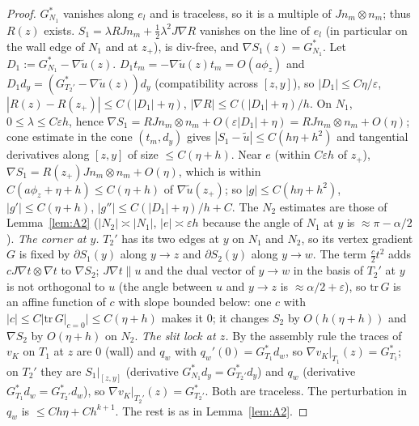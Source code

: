 \documentclass[11pt]{article}
\theoremstyle{remark}
\begin{document}
\begin{proof}
$G^*_{N_1}$ vanishes along $e_l$ and is traceless, so it is a multiple of $Jn_m\otimes n_m$; thus $R(z)$ exists. $S_1=\lambda RJn_m+\frac12\lambda^2J\nabla R$
vanishes on the line of $e_l$ (in particular on the wall edge of $N_1$ and at $z_+$), is div-free, and $\nabla S_1(z)=G^*_{N_1}$.
Let $D_1:=G^*_{N_1}-\nabla\tilde u(z)$. $D_1t_m=-\nabla\tilde u(z)t_m=O(a\phi_z)$ and $D_1d_y=(G^*_{T_2'}-\nabla\tilde u(z))d_y$ (compatibility across $[z,y]$), so
$|D_1|\le C\eta/\varepsilon$, $|R(z)-R(z_+)|\le C(|D_1|+\eta)$, $|\nabla R|\le C(|D_1|+\eta)/h$. On $N_1$, $0\le\lambda\le C\varepsilon h$, hence
$\nabla S_1=RJn_m\otimes n_m+O(\varepsilon|D_1|+\eta)=RJn_m\otimes n_m+O(\eta)$; cone estimate in the cone $(t_m,d_y)$ gives $|S_1-\tilde u|\le C(h\eta+h^2)$
and tangential derivatives along $[z,y]$ of size $\le C(\eta+h)$. Near $e$ (within $C\varepsilon h$ of $z_+$), $\nabla S_1=R(z_+)Jn_m\otimes n_m+O(\eta)$, which is within
$C(a\phi_z+\eta+h)\le C(\eta+h)$ of $\nabla\tilde u(z_+)$; so $|g|\le C(h\eta+h^2)$, $|g'|\le C(\eta+h)$, $|g''|\le C(|D_1|+\eta)/h+C$. The $N_2$ estimates are those of
Lemma~\ref{lem:A2} ($|N_2|\asymp|N_1|$, $|e|\asymp\varepsilon h$ because the angle of $N_1$ at $y$ is $\approx\pi-\alpha/2$).
\emph{The corner at $y$.} $T_2'$ has its two edges at $y$ on $N_1$ and $N_2$, so its vertex gradient $G$ is fixed by $\partial S_1(y)$ along $y\to z$ and $\partial S_2(y)$ along
$y\to w$. The term $\frac c2t^2$ adds $cJ\nabla t\otimes\nabla t$ to $\nabla S_2$; $J\nabla t\parallel u$ and the dual vector of $y\to w$ in the basis of $T_2'$ at $y$ is
not orthogonal to $u$ (the angle between $u$ and $y\to z$ is $\approx\alpha/2+\varepsilon$), so $\mathrm{tr}\,G$ is an affine function of $c$ with slope bounded
below: one $c$ with $|c|\le C|\mathrm{tr}\,G|_{c=0}|\le C(\eta+h)$ makes it $0$; it changes $S_2$ by $O(h(\eta+h))$ and $\nabla S_2$ by $O(\eta+h)$ on $N_2$.
\emph{The slit lock at $z$.} By the assembly rule the traces of $v_K$ on $T_1$ at $z$ are $0$ (wall) and $q_w$ with $q_w'(0)=G^*_{T_1}d_w$, so $\nabla v_K|_{T_1}(z)=G^*_{T_1}$;
on $T_2'$ they are $S_1|_{[z,y]}$ (derivative $G^*_{N_1}d_y=G^*_{T_2'}d_y$) and $q_w$ (derivative $G^*_{T_1}d_w=G^*_{T_2'}d_w$), so $\nabla v_K|_{T_2'}(z)=G^*_{T_2'}$. Both are traceless.
The perturbation in $q_w$ is $\le Ch\eta+Ch^{k+1}$. The rest is as in Lemma~\ref{lem:A2}.
\end{proof}
\end{document}
